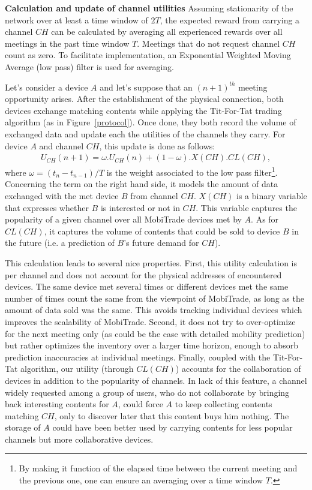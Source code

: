 \textbf{Calculation and update of channel utilities}
Assuming stationarity of the network over at least a time window of $2T$, the expected reward from carrying a channel $CH$ can be calculated by averaging all experienced rewards over all meetings in the past time window $T$. Meetings that do not request channel $CH$ count as zero. To facilitate implementation, an Exponential Weighted Moving Average (low pass) filter is used for averaging.

Let's consider a device $A$ and let's suppose that an $(n+1)^{th}$ meeting opportunity arises. After the establishment of the physical connection, both devices exchange matching contents while applying the Tit-For-Tat trading algorithm (as in Figure~\ref{protocol}). Once done, they both record the volume of exchanged data and update each the utilities of the channels they carry. For device $A$ and channel $CH$, this update is done as follows:
\begin{eqnarray*}
U_{CH}(n+1) = \omega . U_{CH}(n) + (1 - \omega) . X(CH) . CL(CH),
\label{eq:utility-updating}
\end{eqnarray*}
where $\omega = (t_{n}-t_{n-1})/T$ is the weight associated to the low pass filter\footnote{By making it function of the elapsed time between the current meeting and the previous one, one can ensure an averaging over a time window $T$.}. Concerning the term on the right hand side, it models the amount of data exchanged with the met device $B$ from channel $CH$. $X(CH)$ is a binary variable that expresses whether $B$ is interested or not in $CH$. This variable captures the popularity of a given channel over all MobiTrade devices met by $A$. As for $CL(CH)$, it captures the volume of contents that could be sold to device $B$ in the future (i.e. a prediction of $B$'s future demand for $CH$).

This calculation leads to several nice properties. First, this utility calculation is per channel and does not account for the physical addresses of encountered devices. The same device met several times or different devices met the same number of times count the same from the viewpoint of MobiTrade, as long as the amount of data sold was the same. This avoids tracking individual devices which improves the scalability of MobiTrade. Second, it does not try to over-optimize for the next meeting only (as could be the case with detailed mobility prediction) but rather optimizes the inventory over a larger time horizon, enough to absorb prediction inaccuracies at individual meetings. Finally, coupled with the Tit-For-Tat algorithm, our utility (through $CL(CH)$) accounts for the collaboration of devices in addition to the popularity of channels. In lack of this feature, a channel widely requested among a group of users, who do not collaborate by bringing back interesting contents for $A$, could force $A$ to keep collecting contents matching $CH$, only to discover later that this content buys him nothing. The storage of $A$ could have been better used by carrying contents for less popular channels but more collaborative devices.

